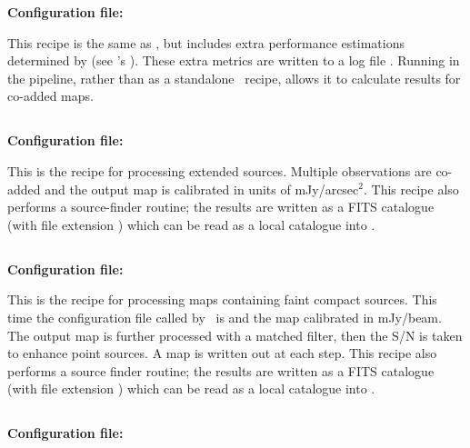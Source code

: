 \textbf{Configuration file: }

This recipe is the same as , but includes extra
performance estimations determined by 
(see \picard's ). These extra
metrics are written to a log file . Running
 in the pipeline, rather than as a
standalone \picard\ recipe, allows it to calculate results for
co-added maps.


\subsection{}

\textbf{Configuration file: }

This is the recipe for processing extended sources. Multiple
observations are co-added and the output map is calibrated in units of
mJy/arcsec$^2$. This recipe also performs a source-finder routine; the
results are written as a FITS catalogue (with file extension
) which can be read as a local catalogue into \gaia.

\subsection{}

\textbf{Configuration file: }

This is the recipe for processing maps containing faint compact
sources. This time the configuration file called by \makemap\ is
 and the map calibrated in
mJy/beam.  The output map is further processed with a matched filter,
then the S/N is taken to enhance point sources.  A map is written out
at each step.  This recipe also performs a source finder routine; the
results are written as a FITS catalogue (with file extension
) which can be read as a local catalogue into \gaia.

\subsection{}

\textbf{Configuration file: }

